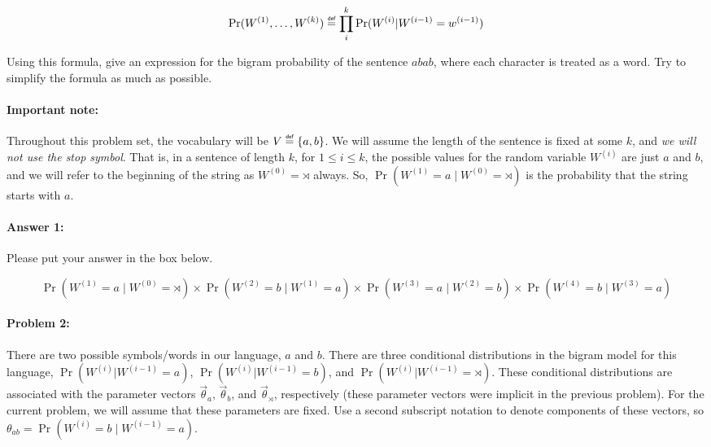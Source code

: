 \documentclass[10pt]{article}
\newenvironment{AnswerBox}{\begin{mdframed}[style=simple]}{\end{mdframed}}
\newcommand\defeq{\mathrel{\overset{\makebox[0pt]{\mbox{\normalfont\tiny\sffamily def}}}{=}}}
\begin{document}
\begin{equation}\label{eq:bigram}
\Pr(W^{(1)},\dots,W^{(k)})
\defeq\prod_i^k \Pr(W^{(i)} | W^{(i-1)}=w^{(i-1)})
\end{equation}

 Using this formula, give an expression for the bigram
probability of the sentence $abab$, where each character is treated as
a word. Try to simplify the formula as much as possible.

\paragraph{Important note:} Throughout this problem set, the vocabulary will be
$V\defeq\{a,b\}$. We will assume the length of the sentence is fixed at some $k$,
and \emph{we will not use the stop symbol}.  
That is, in a sentence of length $k$, for $1 \le i \le k$, the possible
values for the random variable $W^{(i)}$ are just $a$ and $b$, and we 
will refer to the beginning of the string as  $W^{(0)} = \rtimes$ always.
So, $\Pr(W^{(1)}=a \mid W^{(0)}=\rtimes)$ is
the probability that the string starts with $a$.

\paragraph{Answer 1:} Please put your answer in the box below.

\begin{AnswerBox}%

    \[\Pr(W^{(1)}=a \mid W^{(0)}=\rtimes) \times \Pr(W^{(2)}=b \mid W^{(1)}=a) \times \Pr(W^{(3)}=a \mid W^{(2)}=b) \times \Pr(W^{(4)}=b \mid W^{(3)}=a)\]



\end{AnswerBox}%

\hrulefill %

\paragraph{Problem 2:}

There are two possible symbols/words in our language, $a$ and $b$. There are
three conditional distributions in the bigram model for this language, 
$\Pr(W^{(i)} | W^{(i-1)}=a)$, $\Pr(W^{(i)} | W^{(i-1)}=b)$, and
$\Pr(W^{(i)} | W^{(i-1)}=\rtimes)$. 
These conditional distributions are associated with the
parameter vectors $\vec{\theta}_{a}$, $\vec{\theta}_{b}$, and
$\vec{\theta}_{\rtimes}$, respectively (these parameter vectors were implicit in the
previous problem). For the current problem, we will assume that these
parameters are fixed. Use a second subscript notation to denote components of
these vectors, so $\theta_{ab}= \Pr(W^{(i)}=b\mid W^{(i-1)}=a)$.
\end{document}
